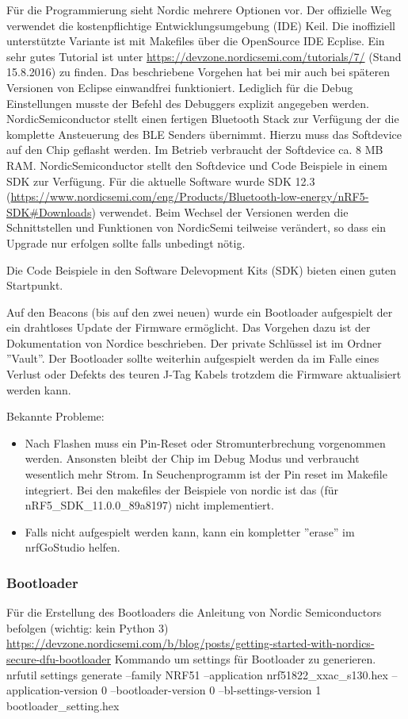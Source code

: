 \documentclass[11pt,ngerman]{scrartcl} %
\begin{document}
Für die Programmierung sieht Nordic mehrere Optionen vor. Der offizielle Weg verwendet die kostenpflichtige Entwicklungsumgebung (IDE) Keil. Die inoffiziell unterstützte Variante ist mit Makefiles über die OpenSource IDE Ecplise. Ein sehr gutes Tutorial ist unter \url{https://devzone.nordicsemi.com/tutorials/7/} (Stand 15.8.2016) zu finden. Das beschriebene Vorgehen hat bei mir auch bei späteren Versionen von Eclipse einwandfrei funktioniert. Lediglich für die Debug Einstellungen musste der Befehl des Debuggers explizit angegeben werden. 
NordicSemiconductor stellt einen fertigen Bluetooth Stack zur Verfügung der die komplette Ansteuerung des BLE Senders übernimmt. Hierzu muss das Softdevice auf den Chip geflasht werden. Im Betrieb verbraucht der Softdevice ca. 8 MB RAM.
NordicSemiconductor stellt den Softdevice und Code Beispiele in einem SDK zur Verfügung. Für die aktuelle Software wurde SDK 12.3 (\url{https://www.nordicsemi.com/eng/Products/Bluetooth-low-energy/nRF5-SDK\#Downloads}) verwendet. Beim Wechsel der Versionen werden die Schnittstellen und Funktionen von NordicSemi teilweise verändert, so dass ein Upgrade nur erfolgen sollte falls unbedingt nötig.

Die Code Beispiele in den Software Delevopment Kits (SDK) bieten einen guten Startpunkt. 

Auf den Beacons (bis auf den zwei neuen) wurde ein Bootloader aufgespielt der ein drahtloses Update der Firmware ermöglicht. Das Vorgehen dazu ist der Dokumentation von Nordice beschrieben. Der private Schlüssel ist im Ordner ''Vault''. Der Bootloader sollte weiterhin aufgespielt werden da im Falle eines Verlust oder Defekts des teuren J-Tag Kabels trotzdem die Firmware aktualisiert werden kann.


Bekannte Probleme:
\begin{itemize}
\item  Nach Flashen muss ein Pin-Reset oder Stromunterbrechung vorgenommen werden. Ansonsten bleibt der Chip im Debug Modus und verbraucht wesentlich mehr Strom.  In Seuchenprogramm ist der Pin reset im Makefile integriert. Bei den makefiles der Beispiele von nordic ist das (für nRF5\_SDK\_11.0.0\_89a8197) nicht implementiert.
\item Falls nicht aufgespielt werden kann, kann ein kompletter ''erase'' im nrfGoStudio helfen.
\end{itemize}
\subsubsection{Bootloader}
Für die Erstellung des Bootloaders die Anleitung von Nordic Semiconductors befolgen (wichtig: kein Python 3)
\url{https://devzone.nordicsemi.com/b/blog/posts/getting-started-with-nordics-secure-dfu-bootloader}
Kommando um settings für Bootloader zu generieren.
nrfutil settings generate --family NRF51 --application nrf51822_xxac_s130.hex --application-version 0 --bootloader-version 0 --bl-settings-version 1 bootloader_setting.hex
\end{document}
